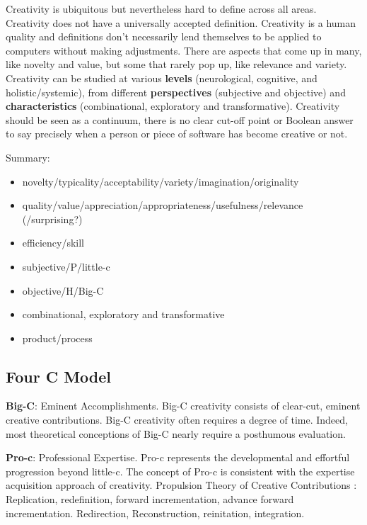 Creativity is ubiquitous but nevertheless hard to define across all areas.
Creativity does not have a universally accepted definition. Creativity is a human quality and definitions don’t necessarily lend themselves to be applied to computers without making adjustments. There are aspects that come up in many, like novelty and value, but some that rarely pop up, like relevance and variety. Creativity can be studied at various \textbf{levels} (neurological, cognitive, and holistic/systemic), from different \textbf{perspectives} (subjective and objective) and \textbf{characteristics} (combinational, exploratory and transformative). Creativity should be seen as a continuum, there is no clear cut-off point or Boolean answer to say precisely when a person or piece of software has become creative or not.

\begin{shaded}
  Summary:\\
  \begin{itemize}
    \item novelty/typicality/acceptability/variety/imagination/originality
    \item quality/value/appreciation/appropriateness/usefulness/relevance (/surprising?)
    \item efficiency/skill
    \item subjective/P/little-c
    \item objective/H/Big-C
    \item combinational, exploratory and transformative
    \item product/process
  \end{itemize}
\end{shaded}

\citep{Berners-Lee1998, Everitt2013, Everitt2012}

\subsection{Four C Model}\citep{Kaufman2009}

\textbf{Big-C}: Eminent Accomplishments. Big-C creativity consists of clear-cut, eminent creative contributions. Big-C creativity often requires a degree of time. Indeed, most theoretical conceptions of Big-C nearly require a posthumous evaluation.

\textbf{Pro-c}: Professional Expertise. Pro-c represents the developmental and effortful progression beyond little-c. The concept of Pro-c is consistent with the expertise acquisition approach of creativity. \citep{Ericsson1996, Ericsson 2007} Propulsion Theory of Creative Contributions \citep{Sternberg2002}: Replication, redefinition, forward incrementation, advance forward incrementation. Redirection, Reconstruction, reinitation, integration.

